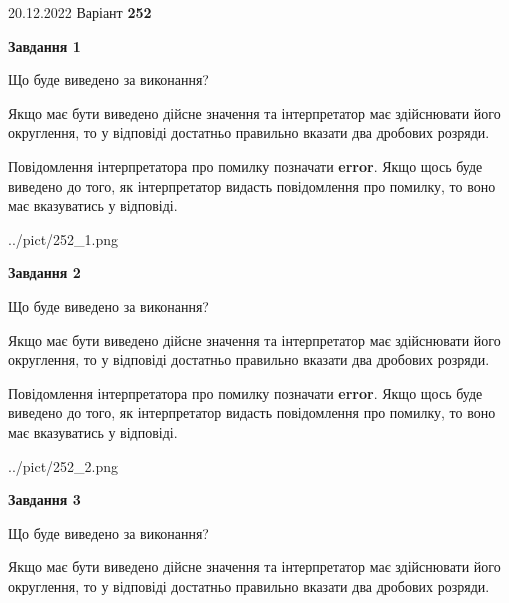 \documentclass[12pt, ukrainian]{article}
\begin{document}
{20.12.2022 Варіант \No \textbf { 252 }\par}
{
\begin {Large}

{\begin {center}\textbf{Завдання 1}\end {center}}\par
Що буде виведено за виконання? \par

Якщо має бути виведено дійсне значення та інтерпретатор має здійснювати його округлення, 
то у відповіді достатньо правильно вказати два дробових розряди.

Повідомлення інтерпретатора про помилку позначати \textbf{error}.
Якщо щось буде виведено до того, як інтерпретатор видасть повідомлення про помилку, 
то воно має вказуватись у відповіді. \par

\begin{center}
	{../pict/252_1.png}
\end{center}
\newpage

{\begin {center}\textbf{Завдання 2}\end {center}}\par
Що буде виведено за виконання? \par

Якщо має бути виведено дійсне значення та інтерпретатор має здійснювати його округлення, 
то у відповіді достатньо правильно вказати два дробових розряди.

Повідомлення інтерпретатора про помилку позначати \textbf{error}.
Якщо щось буде виведено до того, як інтерпретатор видасть повідомлення про помилку, 
то воно має вказуватись у відповіді. \par

\begin{center}
	{../pict/252_2.png}
\end{center}
\newpage

{\begin {center}\textbf{Завдання 3}\end {center}}\par
Що буде виведено за виконання? \par

Якщо має бути виведено дійсне значення та інтерпретатор має здійснювати його округлення, 
то у відповіді достатньо правильно вказати два дробових розряди.


\end{Large}}
\end{document}
